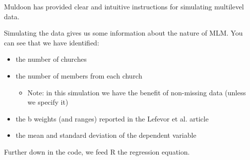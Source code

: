 \documentclass[
  11pt,
]{book}
\providecommand{\tightlist}{%
  \setlength{\itemsep}{0pt}\setlength{\parskip}{0pt}}
\begin{document}
Muldoon \citeyearpar{muldoon_simulate_2018} has provided clear and intuitive instructions for simulating multilevel data.

Simulating the data gives us some information about the nature of MLM. You can see that we have identified:

\begin{itemize}
\tightlist
\item
  the number of churches
\item
  the number of members from each church

  \begin{itemize}
  \tightlist
  \item
    Note: in this simulation we have the benefit of non-missing data (unless we specify it)
  \end{itemize}
\item
  the b weights (and ranges) reported in the Lefevor et al. \citeyearpar{lefevor_homonegativity_2020} article
\item
  the mean and standard deviation of the dependent variable
\end{itemize}

Further down in the code, we feed R the regression equation.
\end{document}
